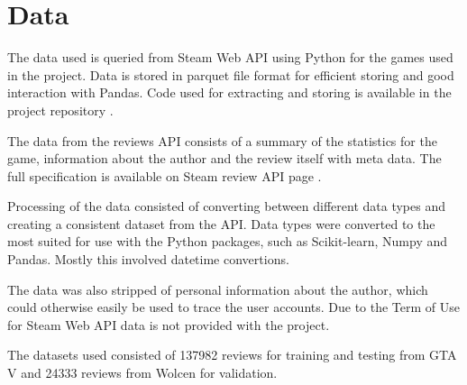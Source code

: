 \chapter{Data}
\label{cha:data}

The data used is queried from Steam Web API \cite{steamworks} using Python for the games used in the project. 
Data is stored in parquet file format \cite{apacheparquet} for efficient storing and good interaction with Pandas.
Code used for extracting and storing is available in the project repository \cite{repository}.

The data from the reviews API consists of a summary of the statistics for the game, information about the author and the review itself with meta data. 
The full specification is available on Steam review API page \cite{steamworks}.

Processing of the data consisted of converting between different data types and creating a consistent dataset from the API. 
Data types were converted to the most suited for use with the Python packages, such as Scikit-learn, Numpy and Pandas.
Mostly this involved datetime convertions.

The data was also stripped of personal information about the author, which could otherwise easily be used to trace the user accounts.
Due to the Term of Use for Steam Web API \cite{steamapi} data is not provided with the project.

The datasets used consisted of 137982 reviews for training and testing from GTA V and 24333 reviews from Wolcen for validation. 